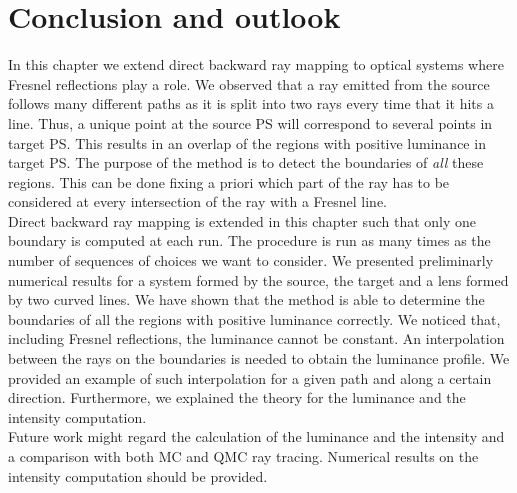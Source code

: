 \section{Conclusion and outlook}
In this chapter we extend direct backward ray mapping to optical systems where Fresnel reflections play a role. We observed that a ray emitted from the source follows many different paths as it is split into two rays every time that it hits a line. Thus, a unique point at the source PS will correspond to several points in target PS. This results in an overlap of the regions with positive luminance in target PS. The purpose of the method is to detect the boundaries of \textit{all} these regions. This can be done fixing a priori which part of the ray has to be considered at every intersection of the ray with a Fresnel line. \\\indent Direct backward ray mapping is extended in this chapter such that only one boundary is computed at each run. The procedure is run as many times as the number of sequences of choices we want to consider. We presented preliminarly numerical results for a system formed by the source, the target and a lens formed by two curved lines. We have shown that the method is able to determine the boundaries of all the regions with positive luminance correctly. We noticed that, including Fresnel reflections, the luminance cannot be constant. An interpolation between the rays on the boundaries is needed to obtain the luminance profile. We provided an example of such interpolation for a given path and along a certain direction. Furthermore, we explained the theory for the luminance and the intensity computation. \\ \indent
Future work might regard the calculation of the luminance and the intensity and a comparison with both MC and QMC ray tracing. Numerical results on the intensity computation should be provided.





